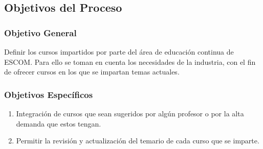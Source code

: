 
\subsection{Objetivos del Proceso} 	%

\subsubsection{Objetivo General}	%
	Definir los cursos impartidos por parte del área de educación continua de ESCOM. Para ello se toman en cuenta los necesidades de la industria, con el fin de ofrecer cursos en los que se impartan temas actuales.
\subsubsection{Objetivos Específicos}	%

\begin{enumerate}[I] 			%
	\item Integración de cursos que sean sugeridos por alg\'un profesor o por la alta demanda que estos tengan.
	\item Permitir la revisi\'on y actualizaci\'on del temario de cada curso que se imparte. 
\end{enumerate}

